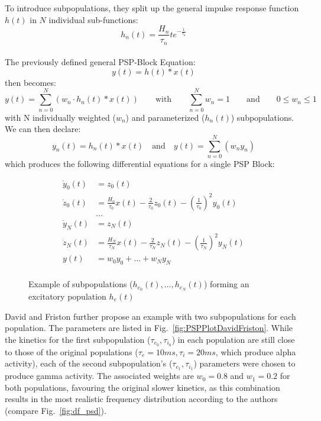 \noindent
To introduce subpopulations, they split up the general impulse response function $h(t)$ in $N$ individual
sub-functions:
\[h_n(t) = \frac{H_n}{\tau_n}te^{-\frac{1}{\tau_n}}\]\\
\noindent
The previously defined general PSP-Block Equation:
\[y(t)=h(t)\ast x(t)\]
then becomes:
\[y(t)=\sum_{n=0}^{N}{(w_n \cdot h_n(t) \ast x(t))} \hspace{2em}
\text{with}
\hspace{2em} \sum_{n=0}^{N}w_n = 1 \hspace{2em}
\text{and}
\hspace{2em} 0 \leq w_n \leq 1\]
with N individually weighted ($w_n$) and parameterized ($h_n(t)$) subpopulations. \\
We can then declare:
\[y_n(t) = h_n(t) \ast x(t) \quad \text{and} \quad y(t) = \sum_{n=0}^{N} (w_{n}y_n)\]
which produces the following differential equations for a single PSP Block:

\begin{equation}
    \begin{aligned}
        \dot{y}_0(t) &= z_0(t) \\
        \dot{z}_0(t) &= \frac{H_0}{\tau_0} x(t) - \frac{2}{\tau_0}z_0(t) - \left(\frac{1}{\tau_0}\right)^{2}y_0(t)\\
        &\dots\\
        \dot{y}_N(t) &= z_N(t) \\
        \dot{z}_N(t) &= \frac{H_N}{\tau_N} x(t) - \frac{2}{\tau_N}z_N(t) - \left(\frac{1}{\tau_N}\right)^{2}y_N(t)\\
        y(t)         &= w_{0}y_0 + \dots + w_{N}y_N\\
    \end{aligned}\label{eq:davidfriston_subpops}
\end{equation}

\begin{figure}[H]
    
    \caption{Example of subpopulations ($h_{e_0}(t), \dots, h_{e_N}(t)$) forming an excitatory population $h_e(t)$}
    \label{fig:exc_subpops}
\end{figure}

\vspace{1em}
\noindent
David and Friston further propose an example with two subpopulations for each population.
The parameters are listed in Fig.~\ref{fig:PSPPlotDavidFriston}.
While the kinetics for the first subpopulation ($\tau_{e_0}, \tau_{i_0}$) in each population are still close
to those of the original populations ($\tau_e=10ms, \tau_i=20ms$, which produce alpha activity),
each of the second subpopulation's  ($\tau_{e_1}, \tau_{i_1}$) parameters were chosen to produce gamma activity.
The associated weights are  $w_0=0.8$ and $w_1=0.2$ for both populations,
favouring the original slower kinetics,
as this combination results in the most realistic frequency distribution according to the authors (compare Fig.~\ref{fig:df_psd}).

